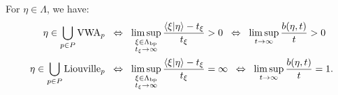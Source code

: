 \begin{observation}
\label{observationVWAbetat}
For $\eta\in\Lambda$, we have:
\begin{align*}
\eta\in\bigcup_{p\in P}\mathrm{VWA}_p
&\;\;\Leftrightarrow\;\; \limsup_{\substack{\xi\in\Lambda_{\mathrm{bp}} \\ t_\xi\to\infty}} \frac{\langle\xi|\eta\rangle - t_\xi}{t_\xi} > 0
\;\;\Leftrightarrow\;\; \limsup_{t\to\infty} \frac{b(\eta,t)}{t} > 0\\
\eta\in\bigcup_{p\in P}\mathrm{Liouville}_p
&\;\;\Leftrightarrow\;\; \limsup_{\substack{\xi\in\Lambda_{\mathrm{bp}} \\ t_\xi\to\infty}} \frac{\langle\xi|\eta\rangle - t_\xi}{t_\xi} = \infty
\;\;\Leftrightarrow\;\; \limsup_{t\to\infty} \frac{b(\eta,t)}{t} = 1.
\end{align*}
\end{observation}
